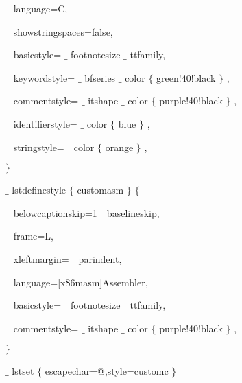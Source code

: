 {\fontsize{10pt}{10pt}\selectfont ~ language=C,}\par

{\fontsize{10pt}{10pt}\selectfont ~ showstringspaces=false,}\par

{\fontsize{10pt}{10pt}\selectfont ~ basicstyle= $ \_ $ footnotesize $ \_ $ ttfamily,}\par

{\fontsize{10pt}{10pt}\selectfont ~ keywordstyle= $ \_ $ bfseries $ \_ $ color $ \{ $ green!40!black $ \} $ ,}\par

{\fontsize{10pt}{10pt}\selectfont ~ commentstyle= $ \_ $ itshape $ \_ $ color $ \{ $ purple!40!black $ \} $ ,}\par

{\fontsize{10pt}{10pt}\selectfont ~ identifierstyle= $ \_ $ color $ \{ $ blue $ \} $ ,}\par

{\fontsize{10pt}{10pt}\selectfont ~ stringstyle= $ \_ $ color $ \{ $ orange $ \} $ ,}\par

{\fontsize{10pt}{10pt}\selectfont  $ \} $ }\par

{\fontsize{10pt}{10pt}\selectfont  $ \_ $ lstdefinestyle $ \{ $ customasm $ \} $  $ \{ $ }\par

{\fontsize{10pt}{10pt}\selectfont ~ belowcaptionskip=1 $ \_ $ baselineskip,}\par

{\fontsize{10pt}{10pt}\selectfont ~ frame=L,}\par

{\fontsize{10pt}{10pt}\selectfont ~ xleftmargin= $ \_ $ parindent,}\par

{\fontsize{10pt}{10pt}\selectfont ~ language=[x86masm]Assembler,}\par

{\fontsize{10pt}{10pt}\selectfont ~ basicstyle= $ \_ $ footnotesize $ \_ $ ttfamily,}\par

{\fontsize{10pt}{10pt}\selectfont ~ commentstyle= $ \_ $ itshape $ \_ $ color $ \{ $ purple!40!black $ \} $ ,}\par

{\fontsize{10pt}{10pt}\selectfont  $ \} $ }\par

{\fontsize{10pt}{10pt}\selectfont  $ \_ $ lstset $ \{ $ escapechar=@,style=customc $ \} $ }\par

